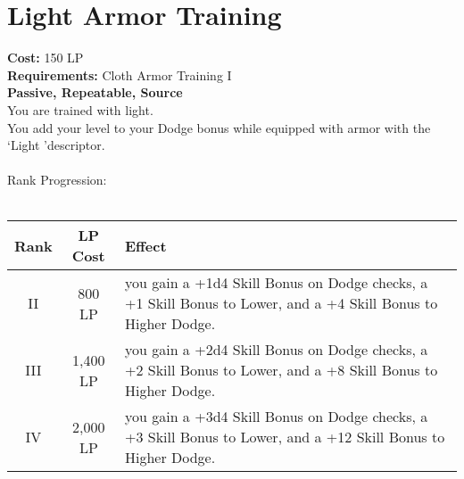 \section{Light Armor Training}\label{perk:lightArmorTraining}
\textbf{Cost:} 150 LP\\
\textbf{Requirements:} Cloth Armor Training I\\
\textbf{Passive, Repeatable, Source}\\
You are trained with light.\\
You add your level to your Dodge bonus while equipped with armor with the \lq Light \rq descriptor.\\
\\

Rank Progression:\\
\\
\begin{longtable}{c | c | p{6cm}}
    Rank & LP Cost  & Effect\\
    \hline
    II   & 800 LP   & you gain a +1d4 Skill Bonus on Dodge checks, a +1 Skill Bonus to Lower, and a +4 Skill Bonus to Higher Dodge.  \\
    III  & 1,400 LP & you gain a +2d4 Skill Bonus on Dodge checks, a +2 Skill Bonus to Lower, and a +8 Skill Bonus to Higher Dodge.  \\
    IV   & 2,000 LP & you gain a +3d4 Skill Bonus on Dodge checks, a +3 Skill Bonus to Lower, and a +12 Skill Bonus to Higher Dodge. \\

\end{longtable}